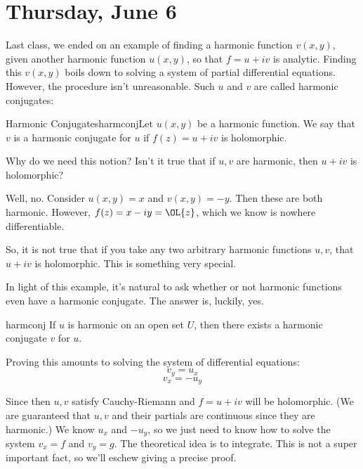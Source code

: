 \section{Thursday, June 6}


Last class, we ended on an example of finding a harmonic function $v(x,y)$, given another harmonic function $u(x,y)$, so that $f = u + iv$ is analytic. Finding this $v(x,y)$ boils down to solving a system of partial differential equations. However, the procedure isn't unreasonable. Such $u$ and $v$ are called harmonic conjugates:

\begin{defbo}{Harmonic Conjugates}{harmconj}Let $u(x,y)$ be a harmonic function. We say that $v$ is a harmonic conjugate for $u$ if $f(z) = u + iv$ is holomorphic.
\end{defbo}

\begin{ex}{}{} Why do we need this notion? Isn't it true that if $u,v$ are harmonic, then $u+iv$ is holomorphic?

Well, no. Consider $u(x,y) = x$ and $v(x,y) = -y$. Then these are both harmonic. However, $f(z) = x-iy = \OL{z}$, which we know is nowhere differentiable.

So, it is not true that if you take any two arbitrary harmonic functions $u,v$, that $u+iv$ is holomorphic. This is something very special.
\end{ex}

In light of this example, it's natural to ask whether or not harmonic functions even have a harmonic conjugate. The answer is, luckily, yes.	

\begin{thmbo}{}{harmconj} If $u$ is harmonic on an open set $U$, then there exists a harmonic conjugate $v$ for $u$.
\end{thmbo}

Proving this amounts to solving the system of differential equations:
$$v_y = u_x$$
$$v_x = -u_y$$

Since then $u,v$ satisfy Cauchy-Riemann and $f = u + iv$ will be holomorphic. (We are guaranteed that $u,v$ and their partials are continuous since they are harmonic.) We know $u_x$ and $-u_y$, so we just need to know how to solve the system $v_x = f$ and $v_y = g$. The theoretical idea is to integrate. This is not a super important fact, so we'll eschew giving a precise proof.

